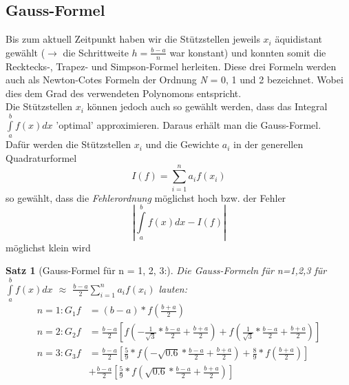 \documentclass{article}
\theoremstyle{satz}
\newtheorem*{satz}{Satz}
\theoremstyle{definition}
\begin{document}
\subsection{Gauss-Formel}
Bis zum aktuell Zeitpunkt haben wir die Stützstellen jeweils $x_i$ äquidistant gewählt ($\rightarrow$ die Schrittweite $h=\frac{b-a}{n}$ war konstant) und konnten somit die Recktecks-, Trapez- und Simpson-Formel herleiten. Diese drei Formeln werden auch als Newton-Cotes Formeln der Ordnung \textit{N} = 0, 1 und 2 bezeichnet. Wobei dies dem Grad des verwendeten Polynomons entspricht.\\
Die Stützstellen $x_i$ können jedoch auch so gewählt werden, dass das Integral $\int\limits_{a}^{b}f(x)dx$ 'optimal' approximieren. Daraus erhält man die Gauss-Formel.\\
Dafür werden die Stützstellen $x_i$ und die Gewichte $a_i$ in der generellen Quadraturformel\\
\begin{equation}
I(f) = \sum\limits_{i=1}^{n}a_i f(x_i)
\end{equation}
so gewählt, dass die \textit{Fehlerordnung} möglichst hoch bzw. der Fehler \\
\begin{equation}
|\int\limits_{a}^{b}f(x)dx-I(f)|
\end{equation}
möglichst klein wird
\theoremstyle{satz}
\begin{tcolorbox}
\begin{satz}[Gauss-Formel für n = 1, 2, 3:]
Die Gauss-Formeln für n=1,2,3 für $\int\limits_{a}^{b}f(x)dx$ $\approx$ $\frac{b-a}{2}\sum\limits_{i=1}^{n}a_if(x_i)$ lauten:
\begin{equation}
\begin{split}
n=1:		G_1f &=(b-a)*f(\frac{b+a}{2})\\
n=2:		G_2f &=\frac{b-a}{2}[f(-\frac{1}{\sqrt{3}}*\frac{b-a}{2}+\frac{b+a}{2})+f(\frac{1}{\sqrt{3}}*\frac{b-a}{2}+\frac{b+a}{2})]\\
n=3:		G_3f &=\frac{b-a}{2}[\frac{5}{9}*f(-\sqrt{0.6}*\frac{b-a}{2}+\frac{b+a}{2})+\frac{8}{9}*f(\frac{b+a}{2})]\\
&+\frac{b-a}{2}[\frac{5}{9}*f(\sqrt{0.6}*\frac{b-a}{2}+\frac{b+a}{2})]
\end{split}
\end{equation}
\end{satz}
\end{tcolorbox}
\end{document}

